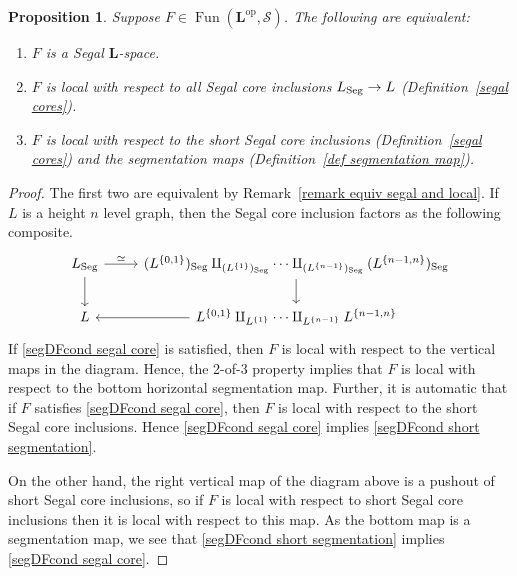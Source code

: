 \documentclass{amsart}
\numberwithin{theorem}{subsection}
\newtheorem{propn}[theorem]{Proposition}
\theoremstyle{definition}
\providecommand{\op}{\mathrm{op}}
\newcommand{\xFun}{\operatorname{Fun}}
\newcommand{\xS}{\mathcal{S}}
\newcommand{\name}[1]{\ensuremath{\text{\textup{#1}}}}
\newcommand{\levelg}{\mathbf{L}}
\newcommand{\Seg}{\name{Seg}}
\begin{document}
\begin{propn}\label{propn:SegDFcond}
Suppose $F \in \xFun(\levelg^{\op},\xS)$.
The following are equivalent:
\begin{enumerate}
\item $F$ is a Segal $\levelg$-space.\label{SegDFcond segal}
\item $F$ is local with respect to all Segal core inclusions $L_{\Seg} \to L$ (Definition~\ref{segal cores}).\label{segDFcond segal core}
\item $F$ is local with respect to the short Segal core inclusions (Definition~\ref{segal cores}) and the segmentation maps (Definition~\ref{def segmentation map}).\label{segDFcond short segmentation}
\end{enumerate}
\end{propn}
\begin{proof}
The first two are equivalent by Remark~\ref{remark equiv segal and local}.
If $L$ is a height $n$ level graph, then the Segal core inclusion factors as the following composite.
\begin{equation*}
\begin{tikzcd}
L_{\Seg} \rar{\simeq} \dar &  (L^{\{0,1\}})_{\Seg} \amalg_{(L^{\{1\}})_{\Seg}} \cdots \amalg_{(L^{\{n-1\}})_{\Seg}} (L^{\{n-1,n\}})_{\Seg} \dar \\
L & L^{\{0,1\}} \amalg_{L^{\{1\}}} \cdots
\amalg_{L^{\{n-1\}}} L^{\{n-1,n\}} \lar 
\end{tikzcd}
\end{equation*}
If \eqref{segDFcond segal core} is satisfied, then $F$ is local with respect to the vertical maps in the diagram. Hence, the 2-of-3 property implies that $F$ is local with respect to the bottom horizontal segmentation map. 
Further, it is automatic that if $F$ satisfies \eqref{segDFcond segal core}, then $F$ is local with respect to the short Segal core inclusions.
Hence \eqref{segDFcond segal core} implies \eqref{segDFcond short segmentation}.

On the other hand, the right vertical map of the diagram above is a pushout of short Segal core inclusions, so if $F$ is local with respect to short Segal core inclusions then it is local with respect to this map.
As the bottom map is a segmentation map, we see that \eqref{segDFcond short segmentation} implies \eqref{segDFcond segal core}.
\end{proof}
\end{document}
